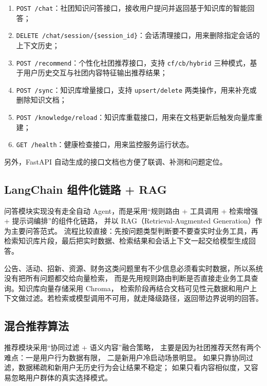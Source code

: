 \begin{enumerate}
  \item \texttt{POST /chat}：社团知识问答接口，接收用户提问并返回基于知识库的智能回答；
  \item \texttt{DELETE /chat/session/\{session\_id\}}：会话清理接口，用来删除指定会话的上下文历史；
  \item \texttt{POST /recommend}：个性化社团推荐接口，支持 \texttt{cf/cb/hybrid} 三种模式，基于用户历史交互与社团内容特征输出推荐结果；
  \item \texttt{POST /sync}：知识库增量接口，支持 \texttt{upsert/delete} 两类操作，用来补充或删除知识文档；
  \item \texttt{POST /knowledge/reload}：知识库重载接口，用来在文档更新后触发向量库重建；
  \item \texttt{GET /health}：健康检查接口，用来监控服务运行状态。
\end{enumerate}

另外，FastAPI 自动生成的接口文档也方便了联调、补测和问题定位。

\subsection{LangChain 组件化链路 + RAG}

问答模块实现没有走全自动 Agent，而是采用“规则路由 + 工具调用 + 检索增强 + 提示词编排”的组件化链路，
并以 RAG（Retrieval-Augmented Generation）作为主要问答范式\cite{langchain_docs,lewis2020rag,rag_applications2023}。
流程比较直接：先按问题类型判断要不要查实时业务工具，再检索知识库片段，最后把实时数据、检索结果和会话上下文一起交给模型生成回答。

公告、活动、招新、资源、财务这类问题里有不少信息必须看实时数据，所以系统没有把所有问题都交给向量检索，
而是先用规则路由判断是否直接走业务工具查询。知识库向量存储采用 Chroma\cite{chroma2023}，
检索阶段再结合文档可见性元数据和用户上下文做过滤。若检索或模型调用不可用，就走降级路径，返回带边界说明的回答。

\subsection{混合推荐算法}

推荐模块采用“协同过滤 + 语义内容”融合策略，
主要是因为社团推荐天然有两个难点：一是用户行为数据有限，
二是新用户冷启动场景明显\cite{collaborative_filtering2009,recommendation_hybrid2002}。
如果只靠协同过滤，数据稀疏和新用户无历史行为会让结果不稳定；
如果只看内容相似度，又容易忽略用户群体的真实选择模式。

